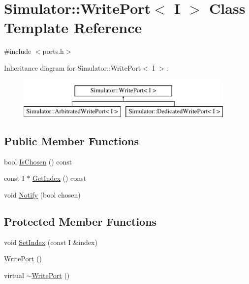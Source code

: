 \hypertarget{class_simulator_1_1_write_port}{\section{Simulator\+:\+:Write\+Port$<$ I $>$ Class Template Reference}
\label{class_simulator_1_1_write_port}
}


{\ttfamily \#include $<$ports.\+h$>$}

Inheritance diagram for Simulator\+:\+:Write\+Port$<$ I $>$\+:\begin{figure}[H]
\begin{center}
\leavevmode
\includegraphics[height=2.000000cm]{class_simulator_1_1_write_port}
\end{center}
\end{figure}
\subsection*{Public Member Functions}
\begin{DoxyCompactItemize}
\item 
bool \hyperlink{class_simulator_1_1_write_port_aad39dfc906f1a14293a76a077703a46d}{Is\+Chosen} () const 
\item 
const I $\ast$ \hyperlink{class_simulator_1_1_write_port_ae90d14b872e1f499d6ed1a7e244f05ad}{Get\+Index} () const 
\item 
void \hyperlink{class_simulator_1_1_write_port_ac56442b508440f46ae15a4dbd1713f03}{Notify} (bool chosen)
\end{DoxyCompactItemize}
\subsection*{Protected Member Functions}
\begin{DoxyCompactItemize}
\item 
void \hyperlink{class_simulator_1_1_write_port_a4656454f4126b4ce42b43639f237824c}{Set\+Index} (const I \&index)
\item 
\hyperlink{class_simulator_1_1_write_port_aba1627d1f853f01dfd13adc6362a28d2}{Write\+Port} ()
\item 
virtual \hyperlink{class_simulator_1_1_write_port_aa8b7475d1bf95536fe906645e928f324}{$\sim$\+Write\+Port} ()
\end{DoxyCompactItemize}


